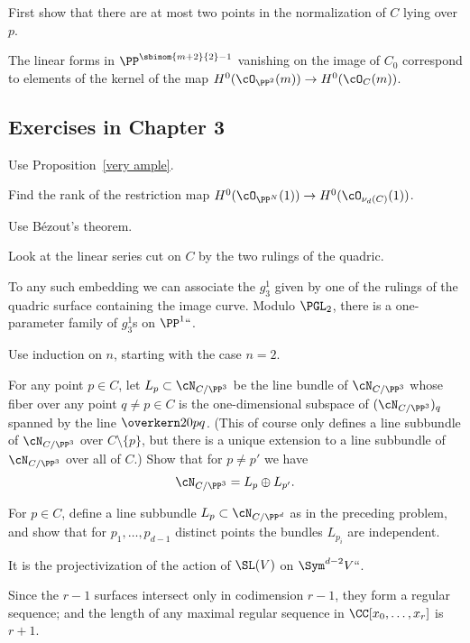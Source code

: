 First show that there are at most two points in the normalization of
$C$ lying over $p$.

The linear forms in $\PP^{\sbinom{m+2}{2} - 1}$ vanishing on the image
of $C_0$ correspond to elements of the kernel of the map
$H^0(\cO_{\PP^2}(m)) \to H^0(\cO_{C}(m))$.

\subsection*{Exercises in Chapter 3\nopunct}

Use Proposition~\ref{very ample}.

Find the rank of the restriction map
$H^0(\cO_{\PP^N}(1)) \to H^0(\cO_{\nu_d(C)}(1))$.

Use B\'ezout's theorem.
%

Look at the linear series cut on $C$ by the two rulings of the quadric.

To any such embedding we can associate the $g^1_3$ given by one of the
rulings of the quadric surface containing the image curve. Modulo
$\PGL_2$, there is a one-parameter family of $g^1_3$s on $\PP^1` `$.

 Use induction on $n$, starting with the case $n=2$.

 For any point $p \in C$, let $L_p \subset \cN_{C/\PP^3}$ be the
line bundle
of $\cN_{C/\PP^3}$ whose fiber over any point $q \neq p \in C$ is the
one-dimensional subspace of $(\cN_{C/\PP^3})_q$ spanned by the line
$\overkern20{pq}$. (This of course only defines a line subbundle of
$\cN_{C/\PP^3}$ over $C \setminus \{p\}$, but there is a unique
extension to a line subbundle of $\cN_{C/\PP^3}$ over all of $C$.)
Show that for $p \neq p'$ we have
$$
\cN_{C/\PP^3} = L_p \oplus L_{p'}.
$$

For $p \in C$, define a line subbundle $L_p \subset \cN_{C/\PP^d}$ as
in the preceding problem, and show that for $p_1,\dots,p_{d-1}$
distinct points the bundles $L_{p_i}$ are independent.

It is the projectivization of the action of $\SL(V)$ on $\Sym^{d-2}V` `$.
%

Since the $r-1$ surfaces intersect only in codimension $r-1$, they form
a regular sequence; and the length of any maximal regular sequence in
$\CC[x_0,\dots, x_r]$ is $r+1$.

